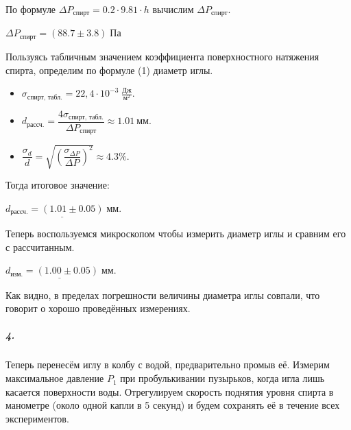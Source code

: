 \documentclass[a4paper, 12pt]{article}
\begin{document}
\bigskip

По формуле $\Delta P_{\text{спирт}} = 0.2 \cdot 9.81 \cdot h$ вычислим $\Delta P_{\text{спирт}}$.

\bigskip

\begin{center}
    \underline{ $\Delta P_{\text{спирт}} = (88.7\pm 3.8) \; \text{Па}$}
\end{center}

Пользуясь табличным значением коэффициента поверхностного натяжения спирта, определим по формуле (1) диаметр иглы. 

\begin{itemize}
    \item 
    $
    \sigma_{\text{спирт, табл.}} = 22,4 \cdot 10^{-3} \; \frac{\text{Дж}}{\text{м}^2}.
    $
    
    \item 
    $
    d_{\text{рассч.}}= \dfrac{4\sigma_{\text{спирт, табл.}}}{\Delta P_{\text{спирт}}}\approx 1.01~\text{мм}.
    $
    
    \item 
    $
    \dfrac{\sigma_d}{d}=\sqrt{\left(\dfrac{\sigma_{\Delta P}}{\Delta P}\right)^2}\approx 4.3\%.
    $
\end{itemize}

\bigskip
    
Тогда итоговое значение:

\begin{center}
    $
    \underline{d_{\text{рассч.}} = (1.01 \pm 0.05) \; \text{мм}}.
    $
\end{center}

Теперь воспользуемся микроскопом чтобы измерить диаметр иглы и сравним его с рассчитанным.
 
\begin{center}
$
\underline{d_{\text{изм.}} = (1.00 \pm 0.05) \; \text{мм}}.
$
\end{center}

Как видно, в пределах погрешности величины диаметра иглы совпали, что говорит о хорошо проведённых измерениях. 

\subparagraph{4.} Теперь перенесём иглу в колбу с водой, предварительно промыв её. Измерим максимальное давление $P_1$ при пробулькивании пузырьков, когда игла лишь касается поверхности воды. Отрегулируем скорость поднятия уровня спирта в манометре (около одной капли в 5 секунд) и будем сохранять её в течение всех экспериментов. 
\end{document}
